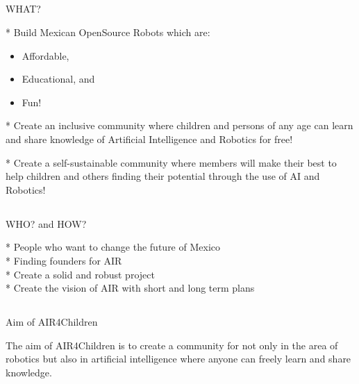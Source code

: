 \documentclass[compress]{beamer}
\begin{document}
\subsection{}
{
\begin{frame}{WHAT?}

* Build Mexican OpenSource Robots which are:
\begin{itemize}
        \item Affordable, 
	\item Educational, and 
	\item Fun!
\end{itemize}

* Create an inclusive community where children and persons of any age can
learn and share knowledge of Artificial Intelligence and
Robotics for free!

* Create a self-sustainable community where
members will make their best to help 
children and others finding their potential 
through the use of AI and Robotics! 

\end{frame}
}



\subsection{}
{
\begin{frame}{WHO? and HOW?}

* People who want to change the future of Mexico \\  
* Finding founders for AIR   \\
* Create a solid and robust project \\
* Create the vision of AIR with short and long term plans \\


\end{frame}
}



\subsection{}
{
\begin{frame}{Aim of AIR4Children}

The aim of AIR4Children is to create a community for not only in the area of robotics 
but also in artificial intelligence 
where anyone can freely learn and share knowledge.


\end{frame}
}
\end{document}
